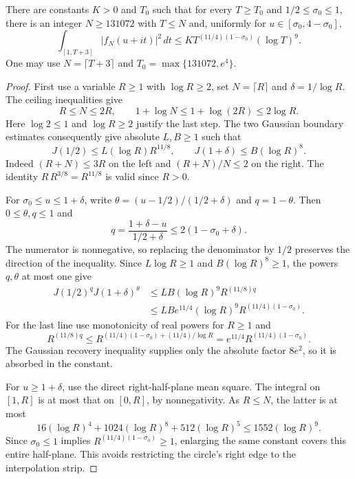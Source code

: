 \begin{lemma}
\label{density:optimized-slices}
\leanok
There are constants $K>0$ and $T_0$ such that for every $T\ge T_0$
and $1/2\le\sigma_0\le1$, there is an integer $N\ge131072$ with
$T\le N$ and, uniformly for $u\in[\sigma_0,4-\sigma_0]$,
\[
 \int_{[1,T+3]}|f_N(u+it)|^2\,dt
 \le K T^{(11/4)(1-\sigma_0)}(\log T)^9.
\]
One may use $N=\lceil T+3\rceil$ and
$T_0=\max\{131072,e^4\}$.
\end{lemma}
\begin{proof}
First use a variable $R\ge1$ with $\log R\ge2$, set
$N=\lceil R\rceil$ and $\delta=1/\log R$.
The ceiling inequalities give
\[
 R\le N\le2R,\qquad
 1+\log N\le1+\log(2R)\le2\log R.
\]
Here $\log2\le1$ and $\log R\ge2$ justify the last step.
The two Gaussian boundary estimates consequently give absolute
$L,B\ge1$ such that
\[
 J(1/2)\le L(\log R)R^{11/8},\qquad
 J(1+\delta)\le B(\log R)^8.
\]
Indeed $(R+N)\le3R$ on the left and $(R+N)/N\le2$ on the right.
The identity $R\,R^{3/8}=R^{11/8}$ is valid since $R>0$.

For $\sigma_0\le u\le1+\delta$, write
$\theta=(u-1/2)/(1/2+\delta)$ and $q=1-\theta$.
Then $0\le\theta,q\le1$ and
\[
 q=\frac{1+\delta-u}{1/2+\delta}
 \le2(1-\sigma_0+\delta).
\]
The numerator is nonnegative, so replacing the denominator by $1/2$
preserves the direction of the inequality.
Since $L\log R\ge1$ and $B(\log R)^8\ge1$, the powers $q,\theta$
at most one give
\begin{align*}
 J(1/2)^qJ(1+\delta)^\theta
 &\le L B(\log R)^9R^{(11/8)q}\\
 &\le LB e^{11/4}(\log R)^9R^{(11/4)(1-\sigma_0)}.
\end{align*}
For the last line use monotonicity of real powers for $R\ge1$ and
\[
 R^{(11/8)q}
 \le R^{(11/4)(1-\sigma_0)+(11/4)/\log R}
 =e^{11/4}R^{(11/4)(1-\sigma_0)}.
\]
The Gaussian recovery inequality supplies only the absolute factor
$8e^2$, so it is absorbed in the constant.

For $u\ge1+\delta$, use the direct right-half-plane mean square.
The integral on $[1,R]$ is at most that on $[0,R]$, by nonnegativity.
As $R\le N$, the latter is at most
\[
 16(\log R)^4+1024(\log R)^8+512(\log R)^5
 \le1552(\log R)^9.
\]
Since $\sigma_0\le1$ implies
$R^{(11/4)(1-\sigma_0)}\ge1$, enlarging the same constant covers
this entire half-plane.  This avoids restricting the circle's right
edge to the interpolation strip.


\end{proof}
